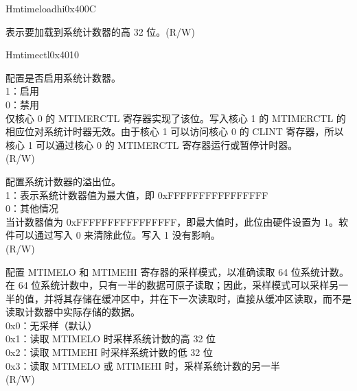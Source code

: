 \begin{register}{H}{mtimeloadhi}{0x400C}\label{regdesc:CLINTMTIMELOADHIREG}
%
\regnewline%
\begin{regdesc}
\begin{reglist}
\label{fielddesc:CLINTMTIMELOADHI}\item [MTIME\_LOADHI] 表示要加载到系统计数器的高 32 位。(R/W)
\end{reglist}
\end{regdesc}
\end{register}

\begin{register}{H}{mtimectl}{0x4010}\label{regdesc:CLINTMTIMECTLREG}
%
%
%
%
\regnewline%
\begin{regdesc}
\begin{reglist}
\label{fielddesc:CLINTMTIMECTLEN}\item [MTIME\_EN] 配置是否启用系统计数器。\\
1：启用\\
0：禁用\\
仅核心 0 的 MTIMERCTL 寄存器实现了该位。写入核心 1 的 MTIMERCTL 的相应位对系统计时器无效。由于核心 1 可以访问核心 0 的 CLINT 寄存器，所以核心 1 可以通过核心 0 的 MTIMERCTL 寄存器运行或暂停计时器。\\
(R/W)
\label{fielddesc:CLINTMTIMECTLOVF}\item [MTIME\_OVF] 配置系统计数器的溢出位。\\
1：表示系统计数器值为最大值，即 0xFFFFFFFFFFFFFFFF\\
0：其他情况\\
当计数器值为 0xFFFFFFFFFFFFFFFF，即最大值时，此位由硬件设置为 1。软件可以通过写入 0 来清除此位。写入 1 没有影响。\\
(R/W)
\label{fielddesc:CLINTMTIMECTLSAM}\item [MTIME\_SAM] 配置 MTIMELO 和 MTIMEHI 寄存器的采样模式，以准确读取 64 位系统计数。在 64 位系统计数中，只有一半的数据可原子读取；因此，采样模式可以采样另一半的值，并将其存储在缓冲区中，并在下一次读取时，直接从缓冲区读取，而不是读取计数器中实际存储的数据。\\
0x0：无采样（默认）\\
0x1：读取 MTIMELO 时采样系统计数的高 32 位\\
0x2：读取 MTIMEHI 时采样系统计数的低 32 位\\
0x3：读取 MTIMELO 或 MTIMEHI 时，采样系统计数的另一半\\
(R/W)
\end{reglist}
\end{regdesc}
\end{register}

